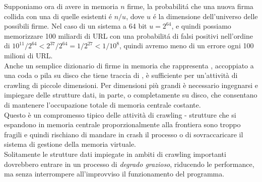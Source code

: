 Supponiamo ora di avere in memoria $n$ firme, la probabilitá che una nuova firma collida con una di quelle esistenti é $n/u$, dove $u$ é la dimensione dell'universo delle possibili firme. Nel caso di un sistema a 64 bit $u = 2^{64}$, e quindi possiamo memorizzare 100 miliardi di URL con una probabilitá di falsi positivi nell'ordine di $10^{11} / 2^{64} < 2^{37} / 2^{64} = 1 / 2^{27} < 1 / 10^8$, quindi avremo meno di un errore ogni 100 milioni di URL.\\
Anche un semplice dizionario di firme in memoria che rappresenta , accoppiato a una coda o pila su disco che tiene traccia di , è sufficiente per un'attività di crawling di piccole dimensioni. Per dimensioni più grandi è necessario ingegnarsi e impiegare delle strutture dati, in parte, o completamente su disco, che consentano di mantenere l'occupazione totale di memoria centrale costante.\\
Questo è un compromesso tipico delle attività di crawling - strutture che si espandono in memoria centrale proporzionalmente alla frontiera sono troppo fragili e quindi rischiano di mandare in crash il processo o di sovraccaricare il sistema di gestione della memoria virtuale.\\
Solitamente le strutture dati impiegate in ambiti di crawling importanti dovrebbero entrare in un processo di \textit{degrado grazioso}, riducendo le performance, ma senza interrompere all'improvviso il funzionamento del programma.
